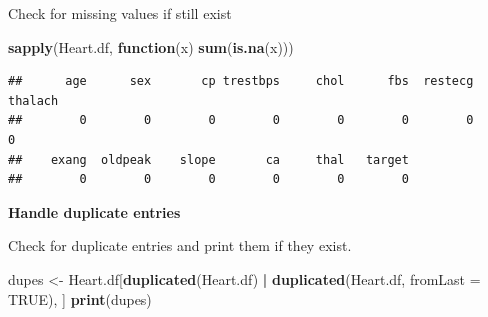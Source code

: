 \documentclass[
]{article}
\newenvironment{Shaded}{\begin{snugshade}}{\end{snugshade}}
\newcommand{\AttributeTok}[1]{\textcolor[rgb]{0.13,0.29,0.53}{#1}}
\newcommand{\ConstantTok}[1]{\textcolor[rgb]{0.56,0.35,0.01}{#1}}
\newcommand{\ControlFlowTok}[1]{\textcolor[rgb]{0.13,0.29,0.53}{\textbf{#1}}}
\newcommand{\FunctionTok}[1]{\textcolor[rgb]{0.13,0.29,0.53}{\textbf{#1}}}
\newcommand{\NormalTok}[1]{#1}
\newcommand{\OtherTok}[1]{\textcolor[rgb]{0.56,0.35,0.01}{#1}}
\newcommand{\SpecialCharTok}[1]{\textcolor[rgb]{0.81,0.36,0.00}{\textbf{#1}}}
\newcommand{\StringTok}[1]{\textcolor[rgb]{0.31,0.60,0.02}{#1}}
\begin{document}
\begin{Shaded}
\end{Shaded}

Check for missing values if still exist

\begin{Shaded}
\begin{Highlighting}[]
\FunctionTok{sapply}\NormalTok{(Heart.df, }\ControlFlowTok{function}\NormalTok{(x) }\FunctionTok{sum}\NormalTok{(}\FunctionTok{is.na}\NormalTok{(x)))}
\end{Highlighting}
\end{Shaded}

\begin{verbatim}
##      age      sex       cp trestbps     chol      fbs  restecg  thalach 
##        0        0        0        0        0        0        0        0 
##    exang  oldpeak    slope       ca     thal   target 
##        0        0        0        0        0        0
\end{verbatim}

\textbf{Handle duplicate entries}

Check for duplicate entries and print them if they exist.

\begin{Shaded}
\begin{Highlighting}[]
\NormalTok{dupes }\OtherTok{\textless{}{-}}\NormalTok{ Heart.df[}\FunctionTok{duplicated}\NormalTok{(Heart.df) }\SpecialCharTok{|} \FunctionTok{duplicated}\NormalTok{(Heart.df, }\AttributeTok{fromLast =} \ConstantTok{TRUE}\NormalTok{), ]}
\FunctionTok{print}\NormalTok{(dupes)}
\end{Highlighting}
\end{Shaded}
\end{document}
